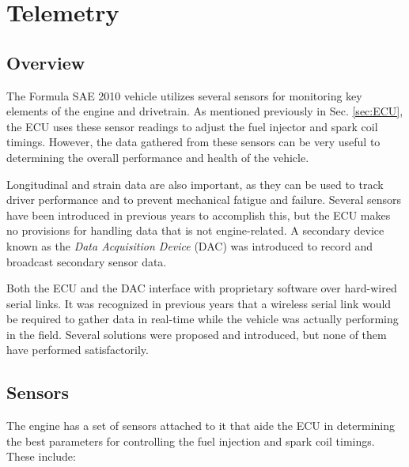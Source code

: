 \section{Telemetry}

\subsection{Overview}
\label{sec:bg_telemetry_overview}

The Formula SAE 2010 vehicle utilizes several sensors for monitoring key elements of the engine and drivetrain. As mentioned previously in Sec. \ref{sec:ECU}, the ECU uses these sensor readings to adjust the fuel injector and spark coil timings. However, the data gathered from these sensors can be very useful to determining the overall performance and health of the vehicle. 

Longitudinal and strain data are also important, as they can be used to track driver performance and to prevent mechanical fatigue and failure. Several sensors have been introduced in previous years to accomplish this, but the ECU makes no provisions for handling data that is not engine-related. A secondary device known as the \emph{Data Acquisition Device} (DAC) was introduced to record and broadcast secondary sensor data.

Both the ECU and the DAC interface with proprietary software over hard-wired serial links. It was recognized in previous years that a wireless serial link would be required to gather data in real-time while the vehicle was actually performing in the field. Several solutions were proposed and introduced, but none of them have performed satisfactorily.

\subsection{Sensors}

The engine has a set of sensors attached to it that aide the ECU in determining the best parameters for controlling the fuel injection and spark coil timings. These include:

